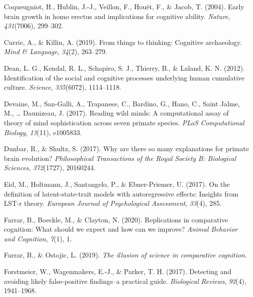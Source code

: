 \documentclass[
  man,floatsintext]{apa6}
\newlength{\cslhangindent}
\newlength{\cslentryspacingunit} %
\newenvironment{CSLReferences}[2] %
 {%
  \setlength{\parindent}{0pt}
  \ifodd #1
  \let\oldpar\par
  \def\par{\hangindent=\cslhangindent\oldpar}
  \fi
  \setlength{\parskip}{#2\cslentryspacingunit}
 }%
 {}
\begin{document}
\begin{CSLReferences}{1}{0}
\leavevmode{}%
Coqueugniot, H., Hublin, J.-J., Veillon, F., Houët, F., \& Jacob, T. (2004). Early brain growth in homo erectus and implications for cognitive ability. \emph{Nature}, \emph{431}(7006), 299--302.

\leavevmode{}%
Currie, A., \& Killin, A. (2019). From things to thinking: Cognitive archaeology. \emph{Mind \& Language}, \emph{34}(2), 263--279.

\leavevmode{}%
Dean, L. G., Kendal, R. L., Schapiro, S. J., Thierry, B., \& Laland, K. N. (2012). Identification of the social and cognitive processes underlying human cumulative culture. \emph{Science}, \emph{335}(6072), 1114--1118.

\leavevmode{}%
Devaine, M., San-Galli, A., Trapanese, C., Bardino, G., Hano, C., Saint Jalme, M., \ldots{} Daunizeau, J. (2017). Reading wild minds: A computational assay of theory of mind sophistication across seven primate species. \emph{PLoS Computational Biology}, \emph{13}(11), e1005833.

\leavevmode{}%
Dunbar, R., \& Shultz, S. (2017). Why are there so many explanations for primate brain evolution? \emph{Philosophical Transactions of the Royal Society B: Biological Sciences}, \emph{372}(1727), 20160244.

\leavevmode{}%
Eid, M., Holtmann, J., Santangelo, P., \& Ebner-Priemer, U. (2017). On the definition of latent-state-trait models with autoregressive effects: Insights from LST-r theory. \emph{European Journal of Psychological Assessment}, \emph{33}(4), 285.

\leavevmode{}%
Farrar, B., Boeckle, M., \& Clayton, N. (2020). Replications in comparative cognition: What should we expect and how can we improve? \emph{Animal Behavior and Cognition}, \emph{7}(1), 1.

\leavevmode{}%
Farrar, B., \& Ostojic, L. (2019). \emph{The illusion of science in comparative cognition}.

\leavevmode{}%
Forstmeier, W., Wagenmakers, E.-J., \& Parker, T. H. (2017). Detecting and avoiding likely false-positive findings--a practical guide. \emph{Biological Reviews}, \emph{92}(4), 1941--1968.


\end{CSLReferences}
\end{document}

